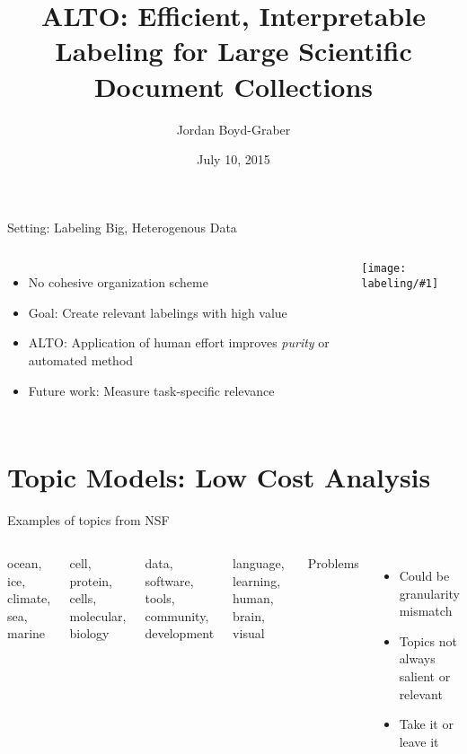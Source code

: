 \documentclass[compress]{beamer}
\title[Labeling Science]{ALTO: Efficient, Interpretable Labeling for Large
  Scientific Document Collections}
\author{ Jordan Boyd-Graber}
\date{July 10, 2015}
\institute[Boulder] %
{University of Colorado Boulder}
\newcommand{\gfx}[2]{
\begin{center}
	\texttt{[image: labeling/\#1]}
\end{center}
}
\begin{document}
\frame{
\titlepage
\tiny
}

\begin{frame}{Setting: Labeling Big, Heterogenous Data}

\begin{columns}


\begin{itemize}
  \item No cohesive organization scheme
  \item Goal: Create relevant labelings with high value
  \item ALTO: Application of human effort improves
    \emph{purity} or automated method
  \item Future work: Measure task-specific relevance
\end{itemize}


\gfx{papers}{.8}
\end{columns}

\end{frame}



\section{Topic Models: Low Cost Analysis}

\begin{frame}{Examples of topics from NSF}

\begin{columns}


\begin{block}{}
ocean, ice, climate, sea, marine
\end{block}

\begin{block}{}
cell, protein, cells, molecular, biology
\end{block}

\begin{block}{}
data, software, tools, community, development
\end{block}

\begin{block}{}
language, learning, human, brain, visual
\end{block}

\pause

Problems
\begin{itemize}
 \item Could be granularity mismatch
  \item Topics not always salient or relevant
  \item Take it or leave it
\end{itemize}

\end{columns}

\end{frame}
\end{document}
